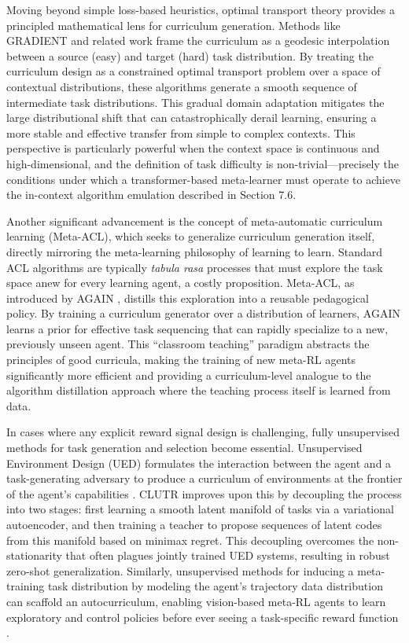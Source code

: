 \documentclass[11pt]{article}
\begin{document}
Moving beyond simple loss-based heuristics, optimal transport theory provides a principled mathematical lens for curriculum generation. Methods like GRADIENT \cite{ref373} and related work \cite{ref374} frame the curriculum as a geodesic interpolation between a source (easy) and target (hard) task distribution. By treating the curriculum design as a constrained optimal transport problem over a space of contextual distributions, these algorithms generate a smooth sequence of intermediate task distributions. This gradual domain adaptation mitigates the large distributional shift that can catastrophically derail learning, ensuring a more stable and effective transfer from simple to complex contexts. This perspective is particularly powerful when the context space is continuous and high-dimensional, and the definition of task difficulty is non-trivial---precisely the conditions under which a transformer-based meta-learner must operate to achieve the in-context algorithm emulation described in Section 7.6.

Another significant advancement is the concept of meta-automatic curriculum learning (Meta-ACL), which seeks to generalize curriculum generation itself, directly mirroring the meta-learning philosophy of learning to learn. Standard ACL algorithms are typically \emph{tabula rasa} processes that must explore the task space anew for every learning agent, a costly proposition. Meta-ACL, as introduced by AGAIN \cite{ref375,ref376}, distills this exploration into a reusable pedagogical policy. By training a curriculum generator over a distribution of learners, AGAIN learns a prior for effective task sequencing that can rapidly specialize to a new, previously unseen agent. This ``classroom teaching'' paradigm abstracts the principles of good curricula, making the training of new meta-RL agents significantly more efficient and providing a curriculum-level analogue to the algorithm distillation approach where the teaching process itself is learned from data.

In cases where any explicit reward signal design is challenging, fully unsupervised methods for task generation and selection become essential. Unsupervised Environment Design (UED) formulates the interaction between the agent and a task-generating adversary to produce a curriculum of environments at the frontier of the agent's capabilities \cite{ref377,ref378}. CLUTR \cite{ref379} improves upon this by decoupling the process into two stages: first learning a smooth latent manifold of tasks via a variational autoencoder, and then training a teacher to propose sequences of latent codes from this manifold based on minimax regret. This decoupling overcomes the non-stationarity that often plagues jointly trained UED systems, resulting in robust zero-shot generalization. Similarly, unsupervised methods for inducing a meta-training task distribution by modeling the agent's trajectory data distribution can scaffold an autocurriculum, enabling vision-based meta-RL agents to learn exploratory and control policies before ever seeing a task-specific reward function \cite{ref319}.
\end{document}
